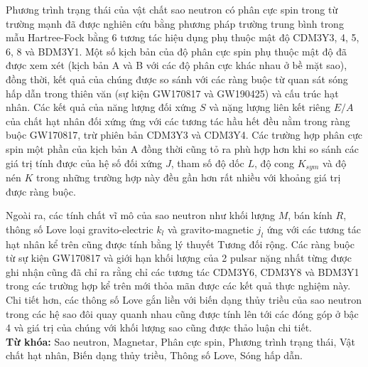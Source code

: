 Phương trình trạng thái của vật chất sao neutron có phân cực spin trong từ trường mạnh đã được nghiên cứu bằng phương pháp trường trung bình trong mẫu Hartree-Fock bằng 6 tương tác hiệu dụng phụ thuộc mật độ CDM3Y3, 4, 5, 6, 8 và BDM3Y1. Một số kịch bản của độ phân cực spin phụ thuộc mật độ đã được xem xét (kịch bản A và B với các độ phân cực khác nhau ở bề mặt sao), đồng thời, kết quả của chúng được so sánh với các ràng buộc từ quan sát sóng hấp dẫn trong thiên văn (sự kiện GW170817 và GW190425) và cấu trúc hạt nhân. Các kết quả của năng lượng đối xứng $S$ và nặng lượng liên kết riêng $E/A$ của chất hạt nhân đối xứng ứng với các tương tác hầu hết đều nằm trong ràng buộc GW170817, trừ phiên bản CDM3Y3 và CDM3Y4. Các trường hợp phân cực spin một phần của kịch bản A đồng thời cũng tỏ ra phù hợp hơn khi so sánh các giá trị tính được của hệ số đối xứng $J$, tham số độ dốc $L$, độ cong $K_{sym}$ và độ nén $K$ trong những trường hợp này đều gần hơn rất nhiều với khoảng giá trị được ràng buộc.\par
Ngoài ra, các tính chất vĩ mô của sao neutron như khối lượng $M$, bán kính $R$, thông số Love loại gravito-electric $k_l$ và gravito-magnetic $j_l$ ứng với các tương tác hạt nhân kể trên cũng được tính bằng lý thuyết Tương đối rộng. Các ràng buộc từ sự kiện GW170817 và giới hạn khối lượng của 2 pulsar nặng nhất từng được ghi nhận cũng đã chỉ ra rằng chỉ các tương tác CDM3Y6, CDM3Y8 và BDM3Y1 trong các trường hợp kể trên mới thỏa mãn được các kết quả thực nghiệm này. Chi tiết hơn, các thông số Love gắn liền với biến dạng thủy triều của sao neutron trong các hệ sao đôi quay quanh nhau cũng được tính lên tới các đóng góp ở bậc 4 và giá trị của chúng với khối lượng sao cũng được thảo luận chi tiết.\\[5mm]
\textbf{Từ khóa:} Sao neutron, Magnetar, Phân cực spin, Phương trình trạng thái, Vật chất hạt nhân, Biến dạng thủy triều, Thông số Love, Sóng hấp dẫn.

